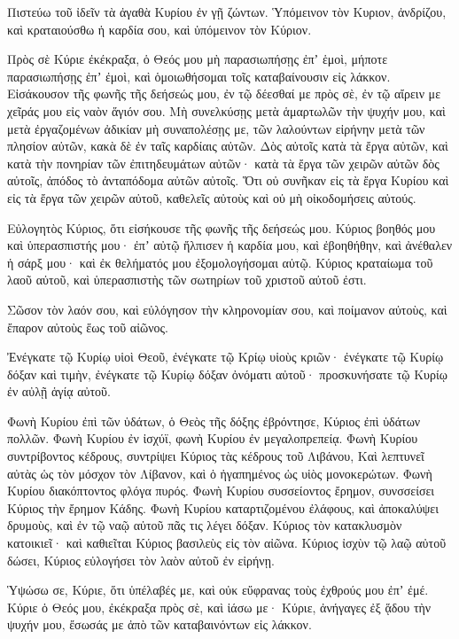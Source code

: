 \begin{spacing}{1.1}
\begin{multicols}{2}
Πιστεύω τοῦ ἰδεῖν τὰ ἀγαθὰ Κυρίου ἐν γῇ ζώντων.
Ὑπόμεινον τὸν Κυριον, ἀνδρίζου, καὶ κραταιούσθω ἡ καρδία σου, καὶ ὑπόμεινον τὸν Κύριον.

Πρὸς σὲ Κύριε ἐκέκραξα, ὁ Θεός μου μὴ παρασιωπήσῃς ἐπʼ ἑμοὶ, μήποτε παρασιωπήσῃς ἐπʼ ἐμοὶ, καὶ ὁμοιωθήσομαι τοῖς καταβαίνουσιν εἰς λάκκον.
Εἰσάκουσον τῆς φωνῆς τῆς δεήσεώς μου, ἐν τῷ δέεσθαί με πρὸς σὲ, ἐν τῷ αἴρειν με χεῖράς μου εἰς ναὸν ἅγιόν σου.
Μὴ συνελκύσῃς μετὰ ἁμαρτωλῶν τὴν ψυχήν μου, καὶ μετὰ ἐργαζομένων ἀδικίαν μὴ συναπολέσῃς με, τῶν λαλούντων εἰρήνην μετὰ τῶν πλησίον αὐτῶν, κακὰ δὲ ἐν ταῖς καρδίαις αὐτῶν.
Δὸς αὐτοῖς κατὰ τὰ ἔργα αὐτῶν, καὶ κατὰ τὴν πονηρίαν τῶν ἐπιτηδευμάτων αὐτῶν· κατὰ τὰ ἔργα τῶν χειρῶν αὐτῶν δὸς αὐτοῖς, ἀπόδος τὸ ἀνταπόδομα αὐτῶν αὐτοῖς.
Ὅτι οὐ συνῆκαν εἰς τὰ ἔργα Κυρίου καὶ εἰς τὰ ἔργα τῶν χειρῶν αὐτοῦ, καθελεῖς αὐτοὺς καὶ οὐ μὴ οἰκοδομήσεις αὐτούς.

Εὐλογητὸς Κύριος, ὅτι εἰσήκουσε τῆς φωνῆς τῆς δεήσεώς μου.
Κύριος βοηθός μου καὶ ὑπερασπιστής μου· ἐπʼ αὐτῷ ἤλπισεν ἡ καρδία μου, καὶ ἐβοηθήθην, καὶ ἀνέθαλεν ἡ σάρξ μου· καὶ ἐκ θελήματός μου ἐξομολογήσομαι αὐτῷ.
Κύριος κραταίωμα τοῦ λαοῦ αὐτοῦ, καὶ ὑπερασπιστὴς τῶν σωτηρίων τοῦ χριστοῦ αὐτοῦ ἐστι.

Σῶσον τὸν λαόν σου, καὶ εὐλόγησον τὴν κληρονομίαν σου, καὶ ποίμανον αὐτοὺς, καὶ ἔπαρον αὐτοὺς ἕως τοῦ αἰῶνος.

Ἐνέγκατε τῷ Κυρίῳ υἱοὶ Θεοῦ, ἐνέγκατε τῷ Κρίῳ υἱοὺς κριῶν· ἐνέγκατε τῷ Κυρίῳ δόξαν καὶ τιμὴν,
ἐνέγκατε τῷ Κυρίῳ δόξαν ὀνόματι αὐτοῦ· προσκυνήσατε τῷ Κυρίῳ ἐν αὐλῇ ἁγίᾳ αὐτοῦ.

Φωνὴ Κυρίου ἐπὶ τῶν ὑδάτων, ὁ Θεὸς τῆς δόξης ἐβρόντησε, Κύριος ἐπὶ ὑδάτων πολλῶν.
Φωνὴ Κυρίου ἐν ἰσχύϊ, φωνὴ Κυρίου ἐν μεγαλοπρεπείᾳ.
Φωνὴ Κυρίου συντρίβοντος κέδρους, συντρίψει Κύριος τὰς κέδρους τοῦ Λιβάνου,
Καὶ λεπτυνεῖ αὐτὰς ὡς τὸν μόσχον τὸν Λίβανον, καὶ ὁ ἠγαπημένος ὡς υἱὸς μονοκερώτων.
Φωνὴ Κυρίου διακόπτοντος φλόγα πυρός.
Φωνὴ Κυρίου συσσείοντος ἔρημον, συνσσείσει Κύριος τὴν ἔρημον Κάδης.
Φωνὴ Κυρίου καταρτιζομένου ἐλάφους, καὶ ἀποκαλύψει δρυμοὺς, καὶ ἐν τῷ ναῷ αὐτοῦ πᾶς τις λέγει δόξαν.
Κύριος τὸν κατακλυσμὸν κατοικιεῖ· καὶ καθιεῖται Κύριος βασιλεὺς εἰς τὸν αἰῶνα.
Κύριος ἰσχὺν τῷ λαῷ αὐτοῦ δώσει, Κύριος εὐλογήσει τὸν λαὸν αὐτοῦ ἐν εἰρήνῃ.

Ὑψώσω σε, Κύριε, ὅτι ὑπέλαβές με, καὶ οὐκ εὔφρανας τοὺς ἐχθρούς μου ἐπʼ ἐμέ.
Κύριε ὁ Θεός μου, ἐκέκραξα πρὸς σὲ, καὶ ἰάσω με·
Κύριε, ἀνήγαγες ἐξ ᾅδου τὴν ψυχήν μου, ἔσωσάς με ἀπὸ τῶν καταβαινόντων εἰς λάκκον.


\end{multicols}
\end{spacing}
